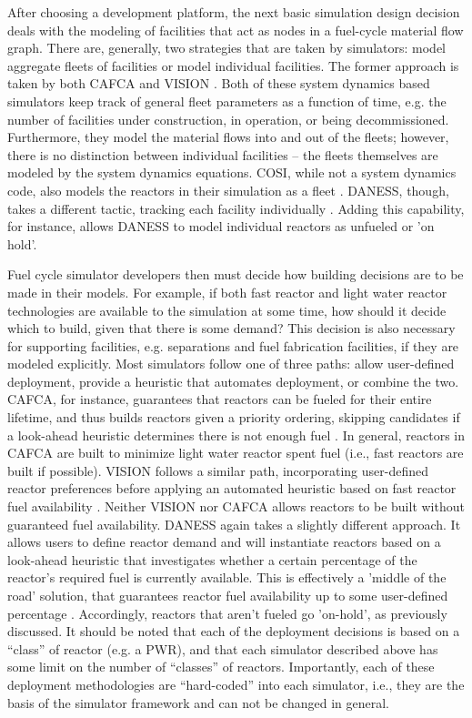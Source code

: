 After choosing a development platform, the next basic simulation design decision
deals with the modeling of facilities that act as nodes in a fuel-cycle material
flow graph. There are, generally, two strategies that are taken by simulators:
model aggregate fleets of facilities or model individual facilities. The former
approach is taken by both CAFCA and
VISION \cite{busquim_e_silva_system_2008,schweitzer_improved_2008}. Both of
these system dynamics based simulators keep track of general fleet parameters as
a function of time, e.g. the number of facilities under construction, in
operation, or being decommissioned. Furthermore, they model the material flows
into and out of the fleets; however, there is no distinction between individual
facilities -- the fleets themselves are modeled by the system dynamics
equations. COSI, while not a system dynamics code, also models the reactors in
their simulation as a fleet \cite{coquelet-pascal_validation_2011}. DANESS,
though, takes a different tactic, tracking each facility
individually \cite{durpel_daness_2003}. Adding this capability, for instance,
allows DANESS to model individual reactors as unfueled or 'on hold'. 

Fuel cycle simulator developers then must decide how building decisions are to
be made in their models. For example, if both fast reactor and light water
reactor technologies are available to the simulation at some time, how should it
decide which to build, given that there is some demand? This decision is also
necessary for supporting facilities, e.g. separations and fuel fabrication
facilities, if they are modeled explicitly. Most simulators follow one of three
paths: allow user-defined deployment, provide a heuristic that automates
deployment, or combine the two. CAFCA, for instance, guarantees that reactors
can be fueled for their entire lifetime, and thus builds reactors given a
priority ordering, skipping candidates if a look-ahead heuristic determines
there is not enough fuel \cite{busquim_e_silva_system_2008}. In general,
reactors in CAFCA are built to minimize light water reactor spent fuel (i.e.,
fast reactors are built if possible). VISION follows a similar path,
incorporating user-defined reactor preferences before applying an automated
heuristic based on fast reactor fuel
availability \cite{schweitzer_improved_2008}. Neither VISION nor CAFCA allows
reactors to be built without guaranteed fuel availability. DANESS again takes a
slightly different approach. It allows users to define reactor demand and will
instantiate reactors based on a look-ahead heuristic that investigates whether a
certain percentage of the reactor's required fuel is currently available. This
is effectively a 'middle of the road' solution, that guarantees reactor fuel
availability up to some user-defined
percentage \cite{guerin_benchmark_2009}. Accordingly, reactors that aren't
fueled go 'on-hold', as previously discussed. It should be noted that each of
the deployment decisions is based on a ``class'' of reactor (e.g. a PWR), and
that each simulator described above has some limit on the number of ``classes''
of reactors. Importantly, each of these deployment methodologies are
``hard-coded'' into each simulator, i.e., they are the basis of the simulator
framework and can not be changed in general.

